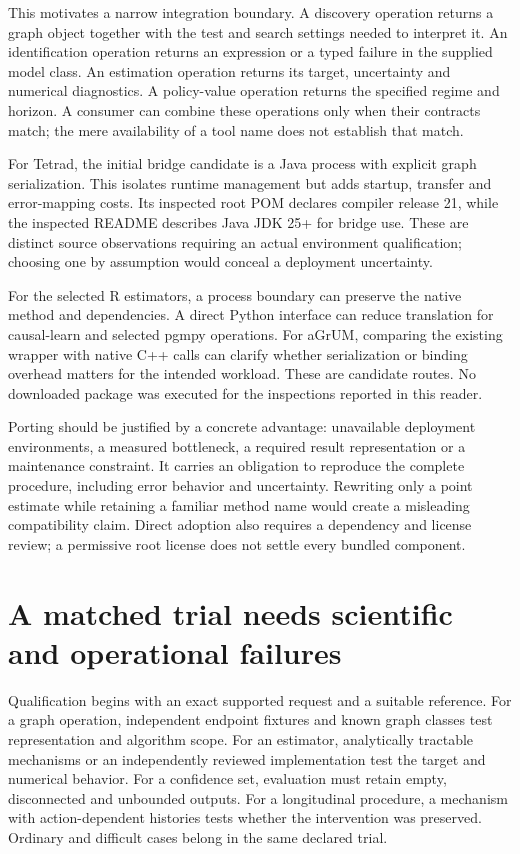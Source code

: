 This motivates a narrow integration boundary. A discovery operation returns
a graph object together with the test and search settings needed to interpret
it. An identification operation returns an expression or a typed failure in
the supplied model class. An estimation operation returns its target,
uncertainty and numerical diagnostics. A policy-value operation returns the
specified regime and horizon. A consumer can combine these operations only
when their contracts match; the mere availability of a tool name does not
establish that match.

For Tetrad, the initial bridge candidate is a Java process with explicit graph
serialization. This isolates runtime management but adds startup, transfer
and error-mapping costs. Its inspected root POM declares compiler release 21,
while the inspected README describes Java JDK 25+ for bridge use. These are
distinct source observations requiring an actual environment qualification;
choosing one by assumption would conceal a deployment uncertainty.
\cite{v12_sw_tetrad}

For the selected R estimators, a process boundary can preserve the native
method and dependencies. A direct Python interface can reduce translation
for causal-learn and selected pgmpy operations. For aGrUM, comparing the
existing wrapper with native C++ calls can clarify whether serialization or
binding overhead matters for the intended workload. These are candidate
routes. No downloaded package was executed for the inspections reported in
this reader.

Porting should be justified by a concrete advantage: unavailable deployment
environments, a measured bottleneck, a required result representation or a
maintenance constraint. It carries an obligation to reproduce the complete
procedure, including error behavior and uncertainty. Rewriting only a point
estimate while retaining a familiar method name would create a misleading
compatibility claim. Direct adoption also requires a dependency and license
review; a permissive root license does not settle every bundled component.

\section{A matched trial needs scientific and operational failures}

Qualification begins with an exact supported request and a suitable reference.
For a graph operation, independent endpoint fixtures and known graph classes
test representation and algorithm scope. For an estimator, analytically
tractable mechanisms or an independently reviewed implementation test the
target and numerical behavior. For a confidence set, evaluation must retain
empty, disconnected and unbounded outputs. For a longitudinal procedure, a
mechanism with action-dependent histories tests whether the intervention was
preserved. Ordinary and difficult cases belong in the same declared trial.

